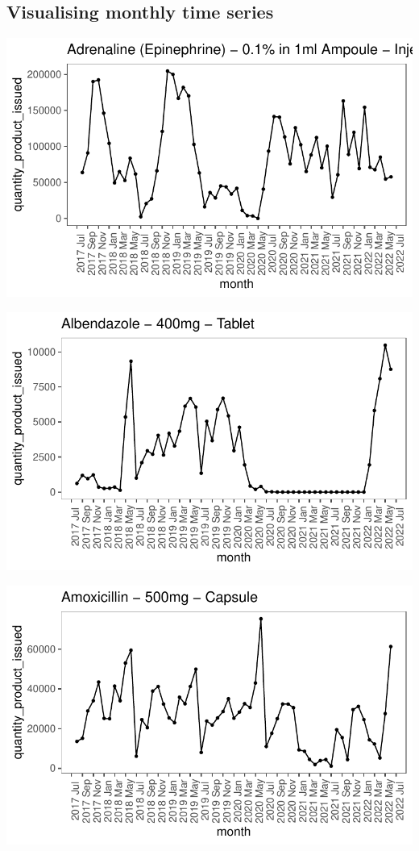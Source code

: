 \documentclass[
  authoryear,
  preprint,
  3p]{elsarticle}
\begin{document}
\hypertarget{visualising-monthly-time-series}{%
\subsection{Visualising monthly time
series}\label{visualising-monthly-time-series}}

\includegraphics{main_files/figure-pdf/unnamed-chunk-10-1.pdf}

\includegraphics{main_files/figure-pdf/unnamed-chunk-11-1.pdf}

\includegraphics{main_files/figure-pdf/unnamed-chunk-12-1.pdf}
\end{document}
